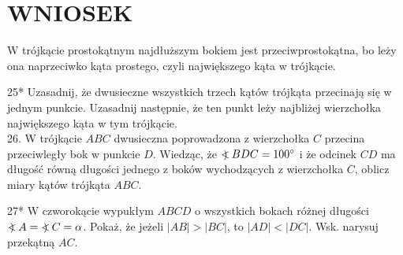 \documentclass[10pt]{article}
\newcommand\Varangle{\mathop{{<\!\!\!\!\!\text{\small)}}\:}\nolimits}
\begin{document}
\section*{WNIOSEK}
W trójkącie prostokątnym najdłuższym bokiem jest przeciwprostokątna, bo leży ona naprzeciwko kąta prostego, czyli największego kąta w trójkącie.

25* Uzasadnij, że dwusieczne wszystkich trzech kątów trójkąta przecinają się w jednym punkcie. Uzasadnij następnie, że ten punkt leży najbliżej wierzchołka największego kąta w tym trójkącie.\\
26. W trójkącie \(A B C\) dwusieczna poprowadzona z wierzchołka \(C\) przecina przeciwległy bok w punkcie \(D\). Wiedząc, że \(\Varangle B D C=100^{\circ}\) i że odcinek \(C D\) ma długość równą długości jednego z boków wychodzących z wierzchołka \(C\), oblicz miary kątów trójkąta \(A B C\).

27* W czworokącie wypukłym \(A B C D\) o wszystkich bokach różnej długości \(\Varangle A=\Varangle C=\alpha\). Pokaż, że jeżeli \(|A B|>|B C|\), to \(|A D|<|D C|\). Wsk. narysuj przekątną \(A C\).
\end{document}
